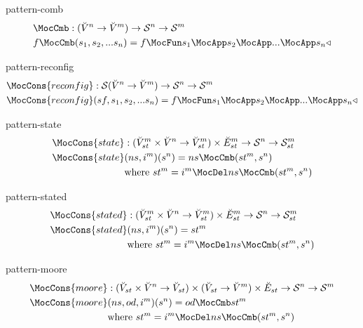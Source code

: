 \documentclass[preview]{standalone}
\begin{document}
\begin{docimage}{pattern-comb}
  \begin{align*}%
    &\MocCmb :
      ({\breve{V}^n \rightarrow \breve{V}^m})
      \rightarrow \mathcal{S}^n \rightarrow \mathcal{S}^m \\
    &f \MocCmb (s_1,s_2,...s_n) =
      f \MocFun s_1 \MocApp s_2 \MocApp ... \MocApp s_n \triangleleft
  \end{align*}
\end{docimage}

\begin{docimage}{pattern-reconfig}
  \begin{align*}%
    & \MocCons{reconfig} :
      \mathcal{S}({\breve{V}^n \rightarrow \breve{V}^m})
      \rightarrow \mathcal{S}^n \rightarrow \mathcal{S}^m \\
    & \MocCons{reconfig}(sf,s_1,s_2,...s_n) =
      f \MocFun s_1 \MocApp s_2 \MocApp ... \MocApp s_n \triangleleft
  \end{align*}
\end{docimage}


\begin{docimage}{pattern-state}
  \begin{align*}%
    \MocCons{state} &:({\breve{V}^m_{st} \times  \breve{V}^n \rightarrow \breve{V}^m_{st}})
                      \times \breve{E}^m_{st}
                      \rightarrow \mathcal{S}^n \rightarrow \mathcal{S}^m_{st} \\
    \MocCons{state} &(ns,i^m)(s^n) = ns \MocCmb (st^m, s^n) \\
                    &\text{where}\ st^m = i^m \MocDel ns \MocCmb (st^m, s^n) 
  \end{align*}
\end{docimage}

\begin{docimage}{pattern-stated}
  \begin{align*}%
    \MocCons{stated} &:({\breve{V}^m_{st} \times  \breve{V}^n \rightarrow \breve{V}^m_{st}})
                      \times \breve{E}^m_{st}
                      \rightarrow \mathcal{S}^n \rightarrow \mathcal{S}^m_{st} \\
    \MocCons{stated} &(ns,i^m)(s^n) = st^m \\
                    &\text{where}\ st^m = i^m \MocDel ns \MocCmb (st^m, s^n) 
  \end{align*}
\end{docimage}

\begin{docimage}{pattern-moore}
  \begin{align*}%
    \MocCons{moore} &:({\breve{V}_{st} \times  \breve{V}^n \rightarrow \breve{V}_{st}})
                      \times ({\breve{V}_{st} \rightarrow \breve{V}^m})
                      \times \breve{E}_{st}
                      \rightarrow \mathcal{S}^n \rightarrow \mathcal{S}^m \\
    \MocCons{moore} &(ns,od,i^m)(s^n) = od \MocCmb st^m \\
                    &\text{where}\ st^m = i^m \MocDel ns \MocCmb (st^m, s^n) 
  \end{align*}
\end{docimage}
\end{document}
